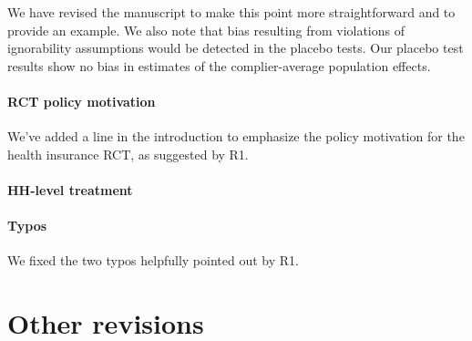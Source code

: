 \documentclass[hidelinks,12pt,letterpaper]{article}
\begin{document}
We have revised the manuscript to make this point more straightforward and to provide an example. We also note that bias resulting from violations of ignorability assumptions would be detected in the placebo tests. Our placebo test results show no bias in estimates of the complier-average population effects. 


\paragraph*{RCT policy motivation}

We've added a line  in the introduction to emphasize the policy motivation for the health insurance RCT, as suggested by R1. 

\paragraph*{HH-level treatment}




\paragraph*{Typos}
We fixed the two typos helpfully pointed out by R1. 

\section{Other revisions}
\end{document}
